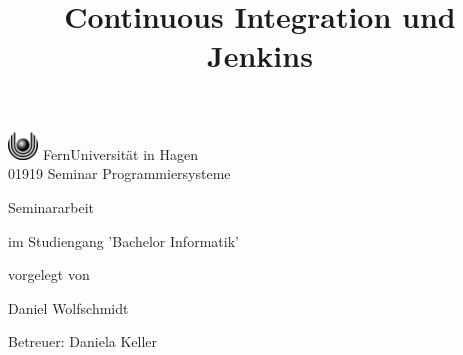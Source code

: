 \documentclass[german,11pt,a4paper]{report} %
\begin{document}
\begin{huge}
\begin{center}
       \includegraphics[width=0.8cm]{./logo/logo.eps} FernUniversität in Hagen\\
				01919 Seminar Programmiersysteme
    \end{center}
\end{huge}

\vspace{3cm}


\title{Continuous Integration und Jenkins}
\date{\vspace{-5ex}}
{\let\newpage\relax\maketitle}
\thispagestyle{empty}


\begin{center}
\begin{large}
\begin{Large}
Seminararbeit\\
\end{Large}
im Studiengang 'Bachelor Informatik' \\
\end{large}
\end{center}
\begin{center}
vorgelegt von\\
\begin{large}
Daniel Wolfschmidt\\
\end{large}
\end{center}
\vspace{1cm}
\begin{center}
\begin{large}
Betreuer: Daniela Keller\\
\end{large}
\end{center}
\end{document}
